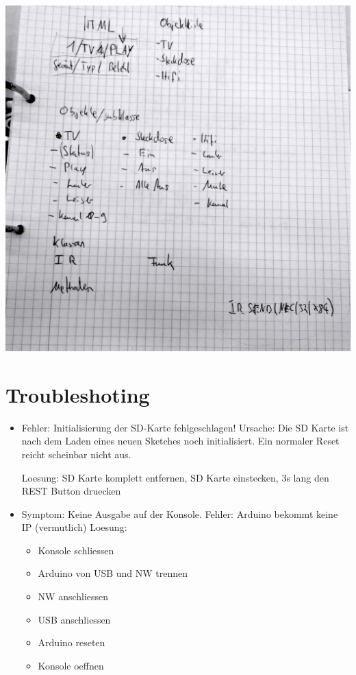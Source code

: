 \documentclass[10pt]{article}
\begin{document}
\includegraphics[width=\textwidth]{images/Stuktur-Sketch.jpg}





\section{Troubleshoting}

\begin{itemize}
\item Fehler: Initialisierung der SD-Karte fehlgeschlagen!
\subitem Ursache: Die SD Karte ist nach dem Laden eines neuen Sketches noch initialisiert. Ein normaler Reset reicht scheinbar nicht aus.

\subitem Loesung: SD Karte komplett entfernen, SD Karte einstecken, 3s lang den REST Button druecken

\item Symptom: Keine Ausgabe auf der Konsole.
\subitem Fehler:  Arduino bekommt keine IP (vermutlich)
\subitem Loesung:
\begin{itemize}
	\item Konsole schliessen
	\item Arduino von USB und NW trennen
	\item NW anschliessen
	\item USB anschliessen
	\item Arduino reseten
	\item Konsole oeffnen
\end{itemize}
\end{itemize}
\end{document}
